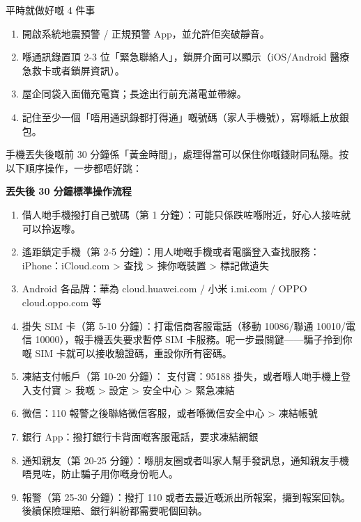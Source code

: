 \begin{tcbpractice}{平時就做好嘅 4 件事}
\begin{enumerate}
  \item 開啟系統地震預警 / 正規預警 App，並允許佢突破靜音。
  \item 喺通訊錄置頂 2-3 位「緊急聯絡人」，鎖屏介面可以顯示（iOS/Android 醫療急救卡或者鎖屏資訊）。
  \item 屋企同袋入面備充電寶；長途出行前充滿電並帶線。
  \item 記住至少一個「唔用通訊錄都打得通」嘅號碼（家人手機號），寫喺紙上放銀包。
\end{enumerate}

\end{tcbpractice}


手機丟失後嘅前 30 分鐘係「黃金時間」，處理得當可以保住你嘅錢財同私隱。按以下順序操作，一步都唔好跳：

\textbf{丟失後 30 分鐘標準操作流程}\par

\begin{enumerate}
  \item 借人哋手機撥打自己號碼（第 1 分鐘）：可能只係跌咗喺附近，好心人接咗就可以拎返嚟。
  \item 遙距鎖定手機（第 2-5 分鐘）：用人哋嘅手機或者電腦登入查找服務： iPhone：iCloud.com > 查找 > 揀你嘅裝置 > 標記做遺失
  \item Android 各品牌：華為 cloud.huawei.com / 小米 i.mi.com / OPPO cloud.oppo.com 等
  \item 掛失 SIM 卡（第 5-10 分鐘）：打電信商客服電話（移動 10086/聯通 10010/電信 10000），報手機丟失要求暫停 SIM 卡服務。呢一步最關鍵——騙子拎到你嘅 SIM 卡就可以接收驗證碼，重設你所有密碼。
  \item 凍結支付帳戶（第 10-20 分鐘）： 支付寶：95188 掛失，或者喺人哋手機上登入支付寶 > 我嘅 > 設定 > 安全中心 > 緊急凍結
  \item 微信：110 報警之後聯絡微信客服，或者喺微信安全中心 > 凍結帳號
  \item 銀行 App：撥打銀行卡背面嘅客服電話，要求凍結網銀
  \item 通知親友（第 20-25 分鐘）：喺朋友圈或者叫家人幫手發訊息，通知親友手機唔見咗，防止騙子用你嘅身份呃人。
  \item 報警（第 25-30 分鐘）：撥打 110 或者去最近嘅派出所報案，攞到報案回執。後續保險理賠、銀行糾紛都需要呢個回執。
\end{enumerate}

